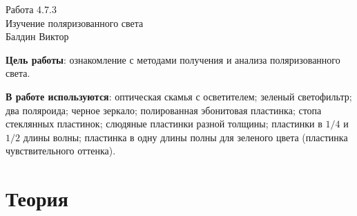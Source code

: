 
\usepackage{booktabs}
\usepackage{multirow}
\usepackage{float}

\usepackage{wrapfig}

\graphicspath{{pictures}}



\begin{center}
  \LARGE{Работа 4.7.3}\\[0.2cm]
  \LARGE{Изучение поляризованного света}\\[0.2cm]
  \large{Балдин Виктор}\\[0.2cm]
\end{center}

\textbf{Цель работы}: ознакомление с методами получения и анализа поляризованного света.


\textbf{В работе используются}: оптическая скамья с осветителем; зеленый светофильтр; два поляроида; черное зеркало; полированная эбонитовая пластинка; стопа стеклянных пластинок; слюдяные пластинки разной толщины; пластинки в $1/4$ и $1/2$ длины волны; пластинка в одну длины полны для зеленого цвета (пластинка чувствительного оттенка).
\section*{Теория}


